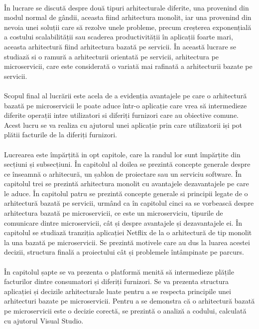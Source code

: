 \documentclass[12pt]{report}
\begin{document}
	\paragraph{}În lucrare se discută despre două tipuri arhitecturale diferite, una provenind din modul normal de gândii, aceasta fiind arhitectura monolit, iar una provenind din nevoia unei soluții care să rezolve unele probleme, precum creșterea exponențială a costului scalabilității sau scaderea productivității în aplicații foarte mari, aceasta arhitectură fiind arhitectura bazată pe servicii. În această lucrare se studiază si o ramură a arhitecturii orientată pe servicii, arhitectura pe microservicii, care este considerată o variată mai rafinată a arhitecturii bazate pe servicii.
	\paragraph{}Scopul final al lucrării este acela de a evidenția avantajele pe care o arhitectură bazată pe microservicii le poate aduce într-o aplicație care vrea să intermedieze diferite operații intre utilizatori si diferiți furnizori care au obiective comune. Acest lucru se va realiza cu ajutorul unei aplicație prin care utilizatorii iși pot plătii facturile de la diferiți furnizori.
	\paragraph{}Lucrearea este împărțită in opt capitole, care la randul lor sunt împărțite din secțiuni și subsecțiuni. În capitolul al doilea se prezintă concepte generale despre ce înseamnă o arhitecură, un șablon de proiectare sau un serviciu software. În capitolul trei se prezintă arhitectura monolit cu avantajele dezavantajele pe care le aduce. În capitolul patru se prezintă concepte generale si principii legate de o arhitectură bazată pe servicii, urmând ca în capitolul cinci sa se vorbească despre arhitectura bazată pe microservicii, ce este un microserviciu, tipurile de comunicare dintre microservicii, cât și despre avantajele și dezavantajele ei. În capitolul se studiază tranziția aplicației Netflix de la o arhitectură de tip monolit la una bazată pe microservicii. Se prezintă motivele care au dus la luarea acestei decizii, structura finală a proiectului cât și problemele întâmpinate pe parcurs.
	\paragraph{}În capitolul șapte se va prezenta o platformă menită să intermedieze plățile facturilor dintre consumatori și diferiți furnizori. Se va prezenta structura aplicației și decizile arhitecturale luate pentru a se respecta principile unei arhitecturi bazate pe microservicii. Pentru a se demonstra că o arhitectură bazată pe microservicii este o decizie corectă, se prezintă o analiză a codului, calculată cu ajutorul Visual Studio.
\end{document}
